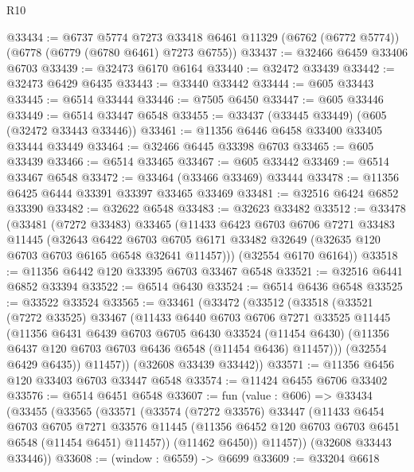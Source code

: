\begin{lexlean}{R10}
\begin{coremodule}
@33434 := @6737
    @5774
    @7273
    @33418
    @6461
    @11329
    (@6762 (@6772 @5774))
    (@6778 (@6779 (@6780 @6461) @7273 @6755))
@33437 := @32466 @6459 @33406 @6703
@33439 := @32473 @6170 @6164
@33440 := @32472 @33439
@33442 := @32473 @6429 @6435
@33443 := @33440 @33442
@33444 := @605 @33443
@33445 := @6514 @33444
@33446 := @7505 @6450
@33447 := @605 @33446
@33449 := @6514 @33447 @6548
@33455 := @33437 (@33445 @33449) (@605 (@32472 @33443 @33446))
@33461 := @11356 @6446 @6458 @33400 @33405 @33444 @33449
@33464 := @32466 @6445 @33398 @6703
@33465 := @605 @33439
@33466 := @6514 @33465
@33467 := @605 @33442
@33469 := @6514 @33467 @6548
@33472 := @33464 (@33466 @33469) @33444
@33478 := @11356 @6425 @6444 @33391 @33397 @33465 @33469
@33481 := @32516 @6424 @6852 @33390
@33482 := @32622 @6548
@33483 := @32623 @33482
@33512 := @33478
    (@33481
      (@7272 @33483)
      @33465
      (@11433
        @6423
        @6703
        @6706
        @7271
        @33483
        @11445
        (@32643
          @6422
          @6703
          @6705
          @6171
          @33482
          @32649
          (@32635 @120 @6703 @6703 @6165 @6548 @32641 @11457)))
      (@32554 @6170 @6164))
@33518 := @11356 @6442 @120 @33395 @6703 @33467 @6548
@33521 := @32516 @6441 @6852 @33394
@33522 := @6514 @6430
@33524 := @6514 @6436 @6548
@33525 := @33522 @33524
@33565 := @33461
    (@33472
      (@33512
        (@33518
          (@33521
            (@7272 @33525)
            @33467
            (@11433
              @6440
              @6703
              @6706
              @7271
              @33525
              @11445
              (@11356
                @6431
                @6439
                @6703
                @6705
                @6430
                @33524
                (@11454 @6430)
                (@11356 @6437 @120 @6703 @6703 @6436 @6548 (@11454 @6436) @11457)))
            (@32554 @6429 @6435))
          @11457))
      (@32608 @33439 @33442))
@33571 := @11356 @6456 @120 @33403 @6703 @33447 @6548
@33574 := @11424 @6455 @6706 @33402
@33576 := @6514 @6451 @6548
@33607 := fun (value : @606) =>
  @33434
    (@33455
      (@33565
        (@33571
          (@33574
            (@7272 @33576)
            @33447
            (@11433
              @6454
              @6703
              @6705
              @7271
              @33576
              @11445
              (@11356 @6452 @120 @6703 @6703 @6451 @6548 (@11454 @6451) @11457))
            (@11462 @6450))
          @11457))
      (@32608 @33443 @33446))
@33608 := (window : @6559) -> @6699
@33609 := @33204 @6618

\end{coremodule}
\end{lexlean}
